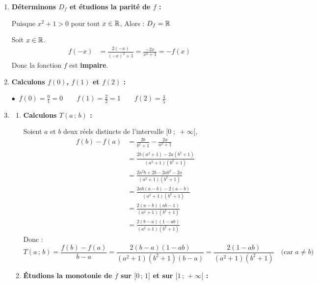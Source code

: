 \documentclass[10pt, a4paper]{article}
\begin{document}
\begin{Solution}
\begin{enumerate}[leftmargin=*,itemsep=0.5pt]
    \item \textbf{Déterminons $D_f$ et étudions la parité de $f$ :}

    Puisque $x^2 + 1 > 0$ pour tout $x \in \mathbb{R}$, Alors : \quad $D_f = \mathbb{R}$

    Soit $x \in \mathbb{R}$.
    \begin{align*}
        f(-x) &= \frac{2(-x)}{(-x)^2 + 1} = \frac{-2x}{x^2 + 1} = -f(x)
    \end{align*}
    Donc la fonction $f$ est \textbf{impaire}.

    \item \textbf{Calculons $f(0)$, $f(1)$ et $f(2)$ :}

    $\bullet~$ $f(0) = \frac{0}{1} = 0 \qquad f(1) = \frac{2}{2} = 1 \qquad f(2) = \frac{4}{5}$ 

    \item
    \begin{enumerate}[leftmargin=*,itemsep=0.5pt]
        \item \textbf{Calculons $T(a\,;\,b)$ :}
        
Soient $a$ et $b$ deux réels distincts de l'intervalle $\big[0 \;;\; +\infty\big[$,
        \begin{align*}
            f(b) - f(a) &= \frac{2b}{b^2 + 1} - \frac{2a}{a^2 + 1} \\[6pt]
                        &= \frac{2b(a^2 + 1) - 2a(b^2 + 1)}{(a^2 + 1)(b^2 + 1)} \\[6pt]
                        &= \frac{2a^2b + 2b - 2ab^2 - 2a}{(a^2 + 1)(b^2 + 1)} \\[6pt]
                        &= \frac{2ab(a - b) - 2(a - b)}{(a^2 + 1)(b^2 + 1)} \\[6pt]
                        &= \frac{2(a - b)(ab - 1)}{(a^2 + 1)(b^2 + 1)} \\[6pt]
                        &= \frac{2(b - a)(1 - ab)}{(a^2 + 1)(b^2 + 1)}
        \end{align*}
Donc : 
        \[ T(a\,;\,b) = \frac{f(b) - f(a)}{b - a} = \frac{2(b-a)(1-ab)}{(a^2+1)(b^2+1)(b-a)} = \frac{2(1 - ab)}{(a^2 + 1)(b^2 + 1)} \quad \text{(car } a \neq b\text{)} \]

        \item \textbf{Étudions la monotonie de $f$ sur $\big[0\,;\,1\big]$ et sur $\big[1\,;\,+\infty\big[$ :}


\end{enumerate}
\end{enumerate}
\end{Solution}
\end{document}
